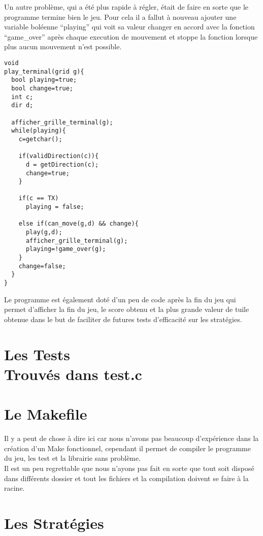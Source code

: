 \documentclass[12pt]{article}
\begin{document}
Un autre problème, qui a été plus rapide à régler, était de faire en sorte que le programme termine bien le jeu. Pour cela il a fallut à nouveau ajouter une variable boléenne ``playing'' qui voit sa valeur changer en accord avec la fonction ``game\_over'' après chaque execution de mouvement et stoppe la fonction lorsque plus aucun mouvement n'est possible.\\
\begin{verbatim}
void
play_terminal(grid g){
  bool playing=true;
  bool change=true;
  int c;
  dir d;

  afficher_grille_terminal(g);
  while(playing){
    c=getchar();

    if(validDirection(c)){
      d = getDirection(c);
      change=true;
    }
    
    if(c == TX)
      playing = false;
    
    else if(can_move(g,d) && change){
      play(g,d);
      afficher_grille_terminal(g);
      playing=!game_over(g);
    }
    change=false;
  }  
}
\end{verbatim}
Le programme est également doté d'un peu de code après la fin du jeu qui permet d'afficher la fin du jeu, le score obtenu et la plus grande valeur de tuile obtenue dans le but de faciliter de futures tests d'efficacité sur les stratégies.

\section{Les Tests
\\{\small Trouvés dans test.c}}

\section{Le Makefile}

Il y a peut de chose à dire ici car nous n'avons pas beaucoup d'expérience dans la création d'un Make fonctionnel, cependant il permet de compiler le programme du jeu, les test et la librairie sans problème.\\

Il est un peu regrettable que nous n'ayons pas fait en sorte que tout soit disposé dans différents dossier et tout les fichiers et la compilation doivent se faire à la racine.

\section{Les Stratégies}
\end{document}
